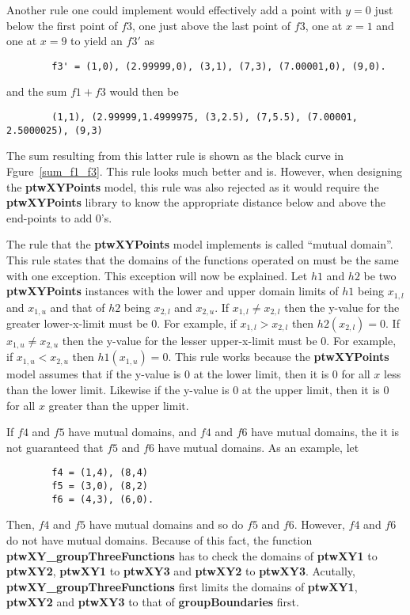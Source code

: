 \documentclass[11pt]{article}
\newcommand{\highlight}[1]{{\bf #1}}
\begin{document}
Another rule one could implement would effectively add a point with $y = 0$ just below the first point of $f3$,
one just above the last point of $f3$, one at $x = 1$ and one at $x = 9$ to yield an $f3'$ as
\begin{verbatim}
        f3' = (1,0), (2.99999,0), (3,1), (7,3), (7.00001,0), (9,0).
\end{verbatim}
and the sum $f1 + f3$ would then be
\begin{verbatim}
        (1,1), (2.99999,1.4999975, (3,2.5), (7,5.5), (7.00001, 2.5000025), (9,3)
\end{verbatim}
The sum resulting from this latter rule is shown as the black curve in Fgure~\ref{sum_f1_f3}. This rule looks much better and is.
However, when designing the \highlight{ptwXYPoints} model, this rule was also rejected as it would require the 
\highlight{ptwXYPoints} library to know the appropriate distance below and above the end-points to add 0's.

The rule that the \highlight{ptwXYPoints} model implements is called ``mutual domain''. This rule states that the
domains of the functions operated on must be the same with one exception. This exception will now be explained. 
Let $h1$ and $h2$ be two \highlight{ptwXYPoints} instances with
the lower and upper domain limits of $h1$ being $x_{1,l}$ and $x_{1,u}$ and that of $h2$ being $x_{2,l}$ and $x_{2,u}$. 
If $x_{1,l} \ne x_{2,l}$ then the y-value for the greater lower-x-limit must be 0. For example, if
$x_{1,l} > x_{2,l}$ then $h2(x_{2,l}) = 0$. If $x_{1,u} \ne x_{2,u}$ then the y-value for the lesser
upper-x-limit must be 0. For example, if $x_{1,u} < x_{2,u}$ then $h1(x_{1,u}) = 0$. This rule works because
the \highlight{ptwXYPoints} model assumes that if the y-value is 0 at the lower limit, then it is 0 for all
$x$ less than the lower limit. Likewise if the y-value is 0 at the upper limit, then it is 0 for all
$x$ greater than the upper limit.

If $f4$ and $f5$ have mutual domains, and $f4$ and $f6$ have mutual domains, the it is not guaranteed that $f5$ and $f6$
have mutual domains. As an example, let
\begin{verbatim}
        f4 = (1,4), (8,4)
        f5 = (3,0), (8,2)
        f6 = (4,3), (6,0).
\end{verbatim}
Then, $f4$ and $f5$ have mutual domains and so do $f5$ and $f6$. However, $f4$ and $f6$ do not have mutual domains.
Because of this fact, the function \highlight{ptwXY\_groupThreeFunctions} has to check the domains of \highlight{ptwXY1} to 
\highlight{ptwXY2}, \highlight{ptwXY1} to \highlight{ptwXY3} and \highlight{ptwXY2} to \highlight{ptwXY3}. Acutally,
\highlight{ptwXY\_groupThreeFunctions} first limits the domains of \highlight{ptwXY1}, \highlight{ptwXY2} and
\highlight{ptwXY3} to that of \highlight{groupBoundaries} first.

\end{document}
